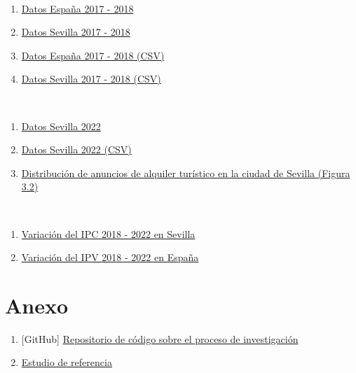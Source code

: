 \documentclass[a4paper,10pt]{article}
\begin{document}
    \begin{thebibliography}{20}

                \ 
                \begin{enumerate}
                    \item \href{https://datahippo.org/es/region/599216cb8a4655339b819813/}{Datos España 2017 - 2018}
                    \item \href{https://datahippo.org/es/region/599230af8a46554edf884651/}{Datos Sevilla 2017 - 2018}
                    \item \href{https://datahippo.org/media/regions/58612732-b2dc-433b-ab78-b8fbe5bbbb16/599216cb8a4655339b819813_airbnb.csv}{Datos España 2017 - 2018 (CSV)}
                    \item \href{https://datahippo.org/media/regions/7e3f7365-8ec0-42f1-a277-9b82743b8a39/599230af8a46554edf884651_airbnb.csv}{Datos Sevilla 2017 - 2018 (CSV)}
                \end{enumerate}
            
                \
                \begin{enumerate}
                    \item \href{http://insideairbnb.com/get-the-data/}{Datos Sevilla 2022}
                    \item \href{http://data.insideairbnb.com/spain/andaluc%C3%ADa/sevilla/2023-03-31/visualisations/listings.csv}{Datos Sevilla 2022 (CSV)}
                    \item \href{http://insideairbnb.com/sevilla}{Distribución de anuncios de alquiler turístico en la ciudad de Sevilla (Figura 3.2)}
                \end{enumerate}

                \
                \begin{enumerate}
                    \item \href{https://www.ine.es/jaxiT3/Datos.htm?t=50918}{Variación del IPC 2018 - 2022 en Sevilla}
                    \item \href{https://www.ine.es/jaxiT3/Datos.htm?t=25173}{Variación del IPV 2018 - 2022 en España}
                \end{enumerate}

    \end{thebibliography}
        
    \hypertarget{anexo}{}
    \section*{Anexo}
        \begin{enumerate}
            \item \hypertarget{github}{[GitHub] \href{https://github.com/m7pantoja/TouristRental}{Repositorio de código sobre el proceso de investigación}}
            \item \href{https://recyt.fecyt.es/index.php/CyTET/article/view/86498/63858}{Estudio de referencia}
        \end{enumerate}
\end{document}

